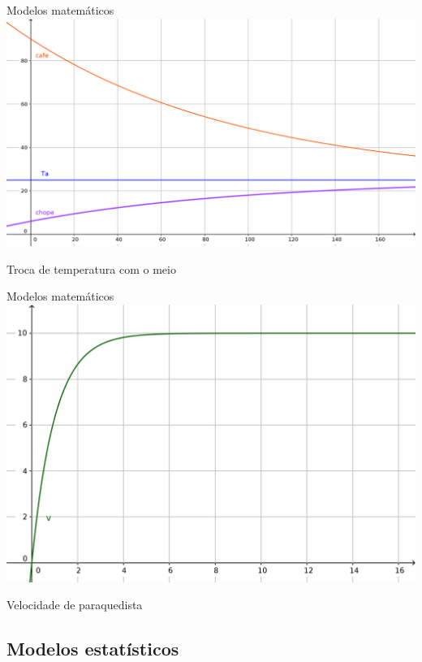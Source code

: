 \documentclass{beamer}
\begin{document}
\begin{frame}{Modelos matemáticos}
  \centering
  \includegraphics[height=.8\textheight]{modelos/cafe_chope}

Troca de temperatura com o meio
\end{frame}

\begin{frame}{Modelos matemáticos}
  \centering
  \includegraphics[height=.8\textheight]{modelos/pqd}

Velocidade de paraquedista
\end{frame}


\subsection{Modelos estatísticos}
\end{document}
